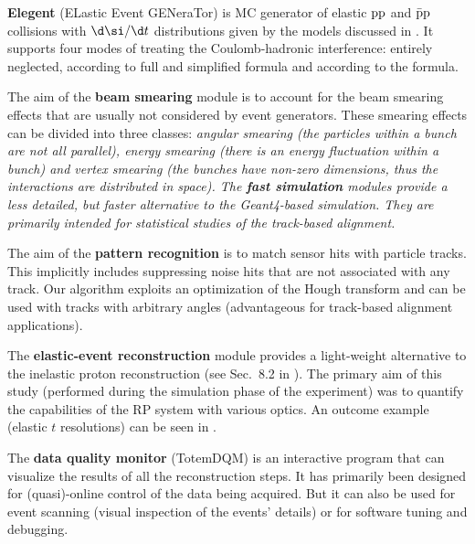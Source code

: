 \> {\bf Elegent} (ELastic Event GENeraTor) is MC generator of elastic $\rm pp$ and $\rm\bar pp$ collisions with $\d\si/\d t$ distributions given by the models discussed in . It supports four modes of treating the Coulomb-hadronic interference: entirely neglected, according to full and simplified \WY{} formula and according to the \KL{} formula.

\> The aim of the {\bf beam smearing} module is to account for the beam smearing effects that are usually not considered by event generators. These smearing effects can be divided into three classes: \em{angular smearing} (the particles within a bunch are not all parallel), \em{energy smearing} (there is an energy fluctuation within a bunch) and \em{vertex smearing} (the bunches have non-zero dimensions, thus the interactions are distributed in space). 
\> The {\bf fast simulation} modules provide a less detailed, but faster alternative to the Geant4-based simulation. They are primarily intended for statistical studies of the track-based alignment.

\> The aim of the {\bf pattern recognition} is to match sensor hits with particle tracks. This implicitly includes suppressing noise hits that are not associated with any track. Our algorithm exploits an optimization of the Hough transform and can be used with tracks with arbitrary angles (advantageous for track-based alignment applications).

\> The {\bf elastic-event reconstruction} module provides a light-weight alternative to the inelastic proton reconstruction (see Sec.~8.2 in ). The primary aim of this study (performed during the simulation phase of the experiment) was to quantify the capabilities of the RP system with various optics. An outcome example (elastic $t$ resolutions) can be seen in .


\> The {\bf data quality monitor} (TotemDQM) is an interactive program that can visualize the results of all the reconstruction steps. It has primarily been designed for (quasi)-online control of the data being acquired. But it can also be used for event scanning (visual inspection of the events' details) or for software tuning and debugging.



